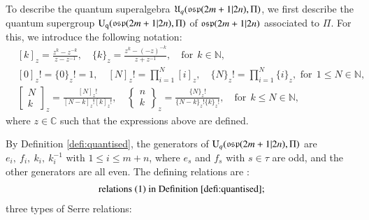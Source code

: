 \documentclass[12pt]{amsart}
\theoremstyle{definition}
\theoremstyle{remark}
\numberwithin{equation}{section}
\begin{document}
To describe the quantum superalgebra ${{\mathfrak U}}_q({{\rm\mathfrak{osp}}}(2m+1|2n), \Pi)$, we first describe the quantum supergroup ${{\rm{U}_q}}({{\rm\mathfrak{osp}}}(2m+1|2n), \Pi)$ of ${{\rm\mathfrak{osp}}}(2m+1|2n)$
associated to $\Pi$.  For this,
we introduce the following notation:
\[\begin{aligned}
&[k]_z=\frac{z^k-z^{-k}}{z-z^{-1}},\quad \{k\}_z=\frac{z^k-(-z)^{-k}}{z+z^{-1}},\quad \mbox{for}\ \  k\in{{\mathbb N}}, \\
&[0]_z!=\{0\}_z!=1, \quad [N]_z!=\prod_{i=1}^N[i]_z,\quad \{N\}_z!=\prod_{i=1}^N\{i\}_z, \mbox{ for}\ \ 1\le N\in{{\mathbb N}},\\
&\begin{bmatrix} N\\k\end{bmatrix}_z=\frac{[N]_z!}{[N-k]_z![k]_z!},\quad \left\{\begin{matrix} n\\k\end{matrix}\right\}_z=\frac{\{N\}_z!}{\{N-k\}_z! \{k\}_z!},\quad \mbox{for}\ \  k\leq N \in {{\mathbb N}},
\end{aligned}
\]
where $z\in{{\mathbb C}}$ such that the expressions above are defined.

By Definition \ref{defi:quantised}, the generators of  ${{\rm U}}_q({{\rm\mathfrak{osp}}}(2m+1|2n), \Pi)$ are
$e_i, \ f_i,  \ k_i, \ k_i^{-1}$ with $1\le i\le m+n$,
where
$e_s$ and $f_s$ with $s\in\tau$ are odd, and the other generators are all even.
The defining  relations are :
\begin{eqnarray}\label{eq:UqB}
\text{relations (1) in Definition \ref{defi:quantised}};
\end{eqnarray}
three types of Serre relations:
\end{document}

